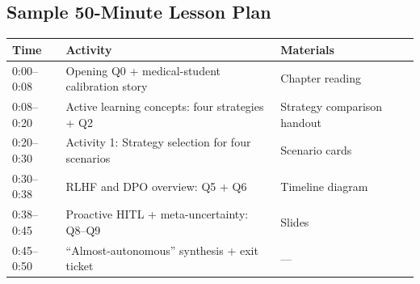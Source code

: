 \subsection*{Sample 50-Minute Lesson Plan}

\begin{center}
\begin{tabular}{p{2cm}p{5cm}p{4cm}}
\toprule
\textbf{Time} & \textbf{Activity} & \textbf{Materials} \\
\midrule
0:00--0:08 & Opening Q0 + medical-student calibration story & Chapter reading \\
0:08--0:20 & Active learning concepts: four strategies + Q2 & Strategy comparison handout \\
0:20--0:30 & Activity 1: Strategy selection for four scenarios & Scenario cards \\
0:30--0:38 & RLHF and DPO overview: Q5 + Q6 & Timeline diagram \\
0:38--0:45 & Proactive HITL + meta-uncertainty: Q8--Q9 & Slides \\
0:45--0:50 & ``Almost-autonomous'' synthesis + exit ticket & --- \\
\bottomrule
\end{tabular}
\end{center}
